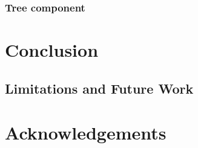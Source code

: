 \documentclass[11pt, a4paper,oneside,chapterprefix=false]{scrbook}
\begin{document}
\subsection{Tree component} \label{subsec:data_visualization_component}
\chapter{Conclusion} \label{chp:discussion_conclusion}



\section{Limitations and Future Work}

\chapter*{Acknowledgements}





\listoffigures
\listoftables
\end{document}
